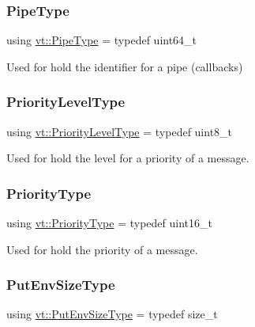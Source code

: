 \mbox{\label{namespacevt_ac9852acda74d1896f48f406cd72c7bd3}} 
\subsubsection{\texorpdfstring{Pipe\+Type}{PipeType}}
{\footnotesize\ttfamily using \hyperlink{namespacevt_ac9852acda74d1896f48f406cd72c7bd3}{vt\+::\+Pipe\+Type} = typedef uint64\+\_\+t}



Used for hold the identifier for a pipe (callbacks) 

\mbox{\label{namespacevt_a53e07fdb3351b0f263e0dfd51b968d5e}} 
\subsubsection{\texorpdfstring{Priority\+Level\+Type}{PriorityLevelType}}
{\footnotesize\ttfamily using \hyperlink{namespacevt_a53e07fdb3351b0f263e0dfd51b968d5e}{vt\+::\+Priority\+Level\+Type} = typedef uint8\+\_\+t}



Used for hold the level for a priority of a message. 

\mbox{\label{namespacevt_a86bff9f556eb761b27fc8600d006ac04}} 
\subsubsection{\texorpdfstring{Priority\+Type}{PriorityType}}
{\footnotesize\ttfamily using \hyperlink{namespacevt_a86bff9f556eb761b27fc8600d006ac04}{vt\+::\+Priority\+Type} = typedef uint16\+\_\+t}



Used for hold the priority of a message. 

\mbox{\label{namespacevt_aa241444e21c15238e185923792814fe4}} 
\subsubsection{\texorpdfstring{Put\+Env\+Size\+Type}{PutEnvSizeType}}
{\footnotesize\ttfamily using \hyperlink{namespacevt_aa241444e21c15238e185923792814fe4}{vt\+::\+Put\+Env\+Size\+Type} = typedef size\+\_\+t}

